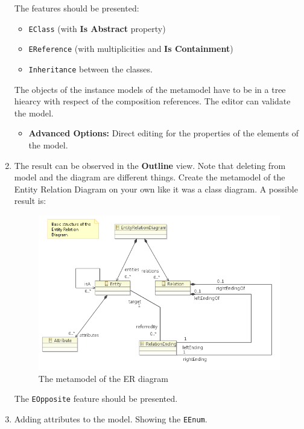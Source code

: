 \documentclass[]{report}
\let\Oldincludegraphics\includegraphics
\renewcommand{\includegraphics}[1]{
\begin{adjustbox}{max size={\textwidth}{\textheight}}
    \Oldincludegraphics[scale=0.6]{#1}%
\end{adjustbox}
}
\begin{document}
\begin{enumerate}
  The features should be presented:

  \begin{itemize}
  \itemsep1pt\parskip0pt
  \item
    \texttt{EClass} (with \textbf{Is Abstract} property)
  \item
    \texttt{EReference} (with multiplicities and \textbf{Is
    Containment})
  \item
    \texttt{Inheritance} between the classes.
  \end{itemize}

  The objects of the instance models of the metamodel have to be in a
  tree hiearcy with respect of the composition references. The editor
  can validate the model.

  \begin{itemize}
  \itemsep1pt\parskip0pt
  \item
    \textbf{Advanced Options:} Direct editing for the properties of the
    elements of the model.
  \end{itemize}
\item
  The result can be observed in the \textbf{Outline} view. Note that
  deleting from model and the diagram are different things. Create the
  metamodel of the Entity Relation Diagram on your own like it was a
  class diagram. A possible result is:

  \begin{figure}[htbp]
  \centering
  \includegraphics{img/emf/ERDiagram01.png}
  \caption{The metamodel of the ER diagram}
  \end{figure}

  The \texttt{EOpposite} feature should be presented.
\item
  Adding attributes to the model. Showing the \texttt{EEnum}.


\end{enumerate}
\end{document}
